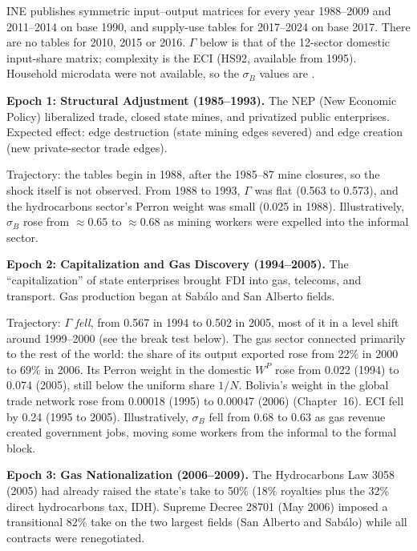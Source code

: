 \documentclass[../structural_economics_book.tex]{subfiles}
\begin{document}
\begin{example}\label{ch23:ex:epochs}
INE publishes symmetric input--output matrices for every year 1988--2009 and 2011--2014 on base 1990, and supply-use tables for 2017--2024 on base 2017. There are no tables for 2010, 2015 or 2016. $\Gamma$ below is that of the 12-sector domestic input-share matrix; complexity is the ECI (HS92, available from 1995). Household microdata were not available, so the $\sigma_B$ values are \illustrative.

\textbf{Epoch 1: Structural Adjustment (1985--1993).} The NEP (New Economic Policy) liberalized trade, closed state mines, and privatized public enterprises. Expected effect: edge destruction (state mining edges severed) and edge creation (new private-sector trade edges).

Trajectory: the tables begin in 1988, after the 1985--87 mine closures, so the shock itself is not observed. From 1988 to 1993, $\Gamma$ was flat (0.563 to 0.573), and the hydrocarbons sector's Perron weight was small (0.025 in 1988). Illustratively, $\sigma_B$ rose from $\approx 0.65$ to $\approx 0.68$ as mining workers were expelled into the informal sector.

\textbf{Epoch 2: Capitalization and Gas Discovery (1994--2005).} The ``capitalization'' of state enterprises brought FDI into gas, telecoms, and transport. Gas production began at Sab\'{a}lo and San Alberto fields.

Trajectory: $\Gamma$ \emph{fell}, from 0.567 in 1994 to 0.502 in 2005, most of it in a level shift around 1999--2000 (see the break test below). The gas sector connected primarily to the rest of the world: the share of its output exported rose from 22\% in 2000 to 69\% in 2006. Its Perron weight in the domestic $W^P$ rose from 0.022 (1994) to 0.074 (2005), still below the uniform share $1/N$. Bolivia's weight in the global trade network rose from 0.00018 (1995) to 0.00047 (2006) (Chapter~16). ECI fell by 0.24 (1995 to 2005). Illustratively, $\sigma_B$ fell from 0.68 to 0.63 as gas revenue created government jobs, moving some workers from the informal to the formal block.

\textbf{Epoch 3: Gas Nationalization (2006--2009).} The Hydrocarbons Law 3058 (2005) had already raised the state's take to 50\% (18\% royalties plus the 32\% direct hydrocarbons tax, IDH). Supreme Decree 28701 (May 2006) imposed a transitional 82\% take on the two largest fields (San Alberto and Sab\'{a}lo) while all contracts were renegotiated.


\end{example}
\end{document}
